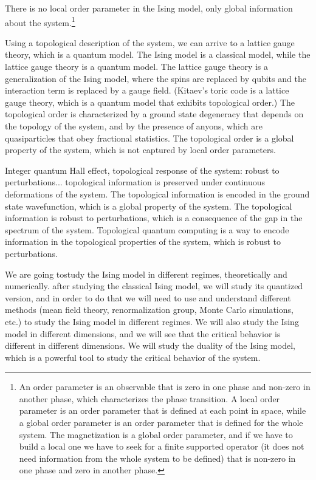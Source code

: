 There is no local order parameter in the Ising model, only global information about the system.\footnote{An order parameter is an observable that is zero in one phase and non-zero in another phase, which characterizes the phase transition. A local order parameter is an order parameter that is defined at each point in space, while a global order parameter is an order parameter that is defined for the whole system. The magnetization is a global order parameter, and if we have to build a local one we have to seek for a finite supported operator (it does not need information from the whole system to be defined) that is non-zero in one phase and zero in another phase.}

Using a topological description of the system, we can arrive to a lattice gauge theory, which is a quantum model. The Ising model is a classical model, while the lattice gauge theory is a quantum model. The lattice gauge theory is a generalization of the Ising model, where the spins are replaced by qubits and the interaction term is replaced by a gauge field. (Kitaev's toric code is a lattice gauge theory, which is a quantum model that exhibits topological order.) The topological order is characterized by a ground state degeneracy that depends on the topology of the system, and by the presence of anyons, which are quasiparticles that obey fractional statistics. The topological order is a global property of the system, which is not captured by local order parameters.

Integer quantum Hall effect, topological response of the system: robust to perturbations... topological information is preserved under continuous deformations of the system. The topological information is encoded in the ground state wavefunction, which is a global property of the system. The topological information is robust to perturbations, which is a consequence of the gap in the spectrum of the system. Topological quantum computing is a way to encode information in the topological properties of the system, which is robust to perturbations.

We are going tostudy the Ising model in different regimes, theoretically and numerically. after studying the classical Ising model, we will study its quantized version, and in order to do that we will need to use and understand different methods (mean field theory, renormalization group, Monte Carlo simulations, etc.) to study the Ising model in different regimes. We will also study the Ising model in different dimensions, and we will see that the critical behavior is different in different dimensions. We will study the duality of the Ising model, which is a powerful tool to study the critical behavior of the system.

